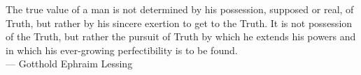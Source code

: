 \cleardoublepage
\thispagestyle{empty}


\vspace*{3cm}

\begin{raggedleft}
The true value of a man is not determined by his possession, supposed or real, of Truth, but rather by his sincere exertion to get to the Truth. It is not possession of the Truth, but rather the pursuit of Truth by which he extends his powers and in which his ever-growing perfectibility is to be found.\\
     --- Gotthold Ephraim Lessing\\
\end{raggedleft}

\vspace{4cm}



